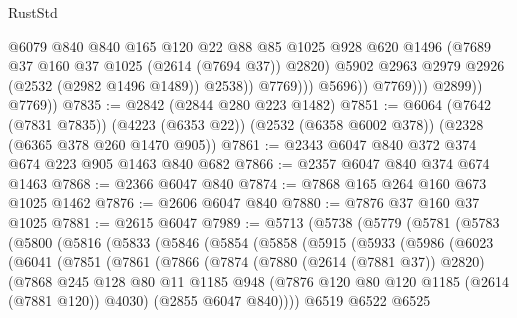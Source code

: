 \begin{lexlean}{RustStd}
\begin{coremodule}
                                @6079
                                @840
                                @840
                                @165
                                @120
                                @22
                                @88
                                @85
                                @1025
                                @928
                                @620
                                @1496
                                (@7689 @37 @160 @37 @1025 (@2614 (@7694 @37)) @2820)
                                @5902
                                @2963
                                @2979
                                @2926
                                (@2532 (@2982 @1496 @1489))
                                @2538))
                            @7769)))
                      @5696))
                  @7769)))
            @2899))
        @7769))
@7835 := @2842 (@2844 @280 @223 @1482)
@7851 := @6064
    (@7642 (@7831 @7835))
    (@4223 (@6353 @22))
    (@2532 (@6358 @6002 @378))
    (@2328 (@6365 @378 @260 @1470 @905))
@7861 := @2343 @6047 @840 @372 @374 @674 @223 @905 @1463 @840 @682
@7866 := @2357 @6047 @840 @374 @674 @1463
@7868 := @2366 @6047 @840
@7874 := @7868 @165 @264 @160 @673 @1025 @1462
@7876 := @2606 @6047 @840
@7880 := @7876 @37 @160 @37 @1025
@7881 := @2615 @6047
@7989 := @5713
    (@5738
      (@5779
        (@5781
          (@5783
            (@5800
              (@5816
                (@5833
                  (@5846
                    (@5854
                      (@5858
                        (@5915
                          (@5933
                            (@5986
                              (@6023
                                (@6041
                                  (@7851
                                    (@7861
                                      (@7866
                                        (@7874
                                          (@7880 (@2614 (@7881 @37)) @2820)
                                          (@7868
                                            @245
                                            @128
                                            @80
                                            @11
                                            @1185
                                            @948
                                            (@7876 @120 @80 @120 @1185 (@2614 (@7881 @120)) @4030)
                                            (@2855 @6047 @840))))
                                      @6519
                                      @6522
                                      @6525

\end{coremodule}
\end{lexlean}
